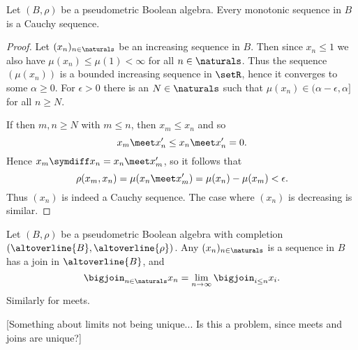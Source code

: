 \documentclass[article, a4paper, 11pt, oneside]{memoir}
\numberwithin{equation}{chapter}
\begin{document}
\begin{lemma}
    \label{thm:monotonic-sequence-Cauchy}
    Let $(B,\rho)$ be a pseudometric Boolean algebra. Every monotonic sequence in $B$ is a Cauchy sequence.
\end{lemma}

\begin{proof}
    Let $(x_n)_{n\in\naturals}$ be an increasing sequence in $B$. Then since $x_n \leq 1$ we also have $\mu(x_n) \leq \mu(1) < \infty$ for all $n \in \naturals$. Thus the sequence $(\mu(x_n))$ is a bounded increasing sequence in $\setR$, hence it converges to some $\alpha \geq 0$. For $\epsilon > 0$ there is an $N \in \naturals$ such that $\mu(x_n) \in (\alpha - \epsilon, \alpha]$ for all $n \geq N$.
    
    If then $m,n \geq N$ with $m \leq n$, then $x_m \leq x_n$ and so
    \begin{equation*}
        x_m \meet x_n'
            \leq x_n \meet x_n'
            = 0.
    \end{equation*}
    Hence $x_m \symdiff x_n = x_n \meet x_m'$, so it follows that
    \begin{equation*}
        \rho(x_m,x_n)
            = \mu(x_n \meet x_m')
            = \mu(x_n) - \mu(x_m)
            < \epsilon.
    \end{equation*}
    Thus $(x_n)$ is indeed a Cauchy sequence. The case where $(x_n)$ is decreasing is similar.
\end{proof}


\begin{proposition}
    Let $(B,\rho)$ be a pseudometric Boolean algebra with completion $(\altoverline{B}, \altoverline{\rho})$. Any $(x_n)_{n\in\naturals}$ is a sequence in $B$ has a join in $\altoverline{B}$, and
    \begin{equation*}
        \bigjoin_{n\in\naturals} x_n
            = \lim_{n\to\infty} \bigjoin_{i \leq n} x_i.
    \end{equation*}
    Similarly for meets.
\end{proposition}
%
[Something about limits not being unique... Is this a problem, since meets and joins are unique?]
\end{document}
